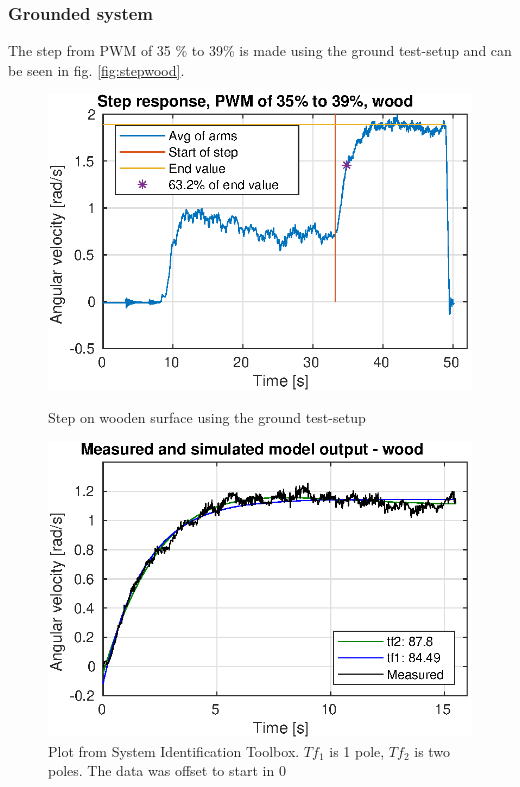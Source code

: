 \subsubsection{Grounded system}
The step from PWM of 35 \% to 39\% is made using the ground test-setup and can be seen in fig. \ref{fig:stepwood}.
\begin{figure}[h!]
    \centering
    \begin{minipage}[t]{0.48\textwidth}
        \centering
        \includegraphics[width=1\textwidth]{figures/results/stepwood.eps}
        \caption{Step on wooden surface using the ground test-setup}
        \label{fig:stepwood}
    \end{minipage}%
    \hspace{.03\textwidth}
    \begin{minipage}[t]{0.48\textwidth}
        \centering
        \includegraphics[width=1\textwidth]{figures/results/stepwood_sysid.eps}
        \caption{Plot from System Identification Toolbox. $Tf_1$ is 1 pole, $Tf_2$ is two poles. The data was offset to start in 0}
        \label{fig:stepwoodsysid}
    \end{minipage}
\end{figure} 
